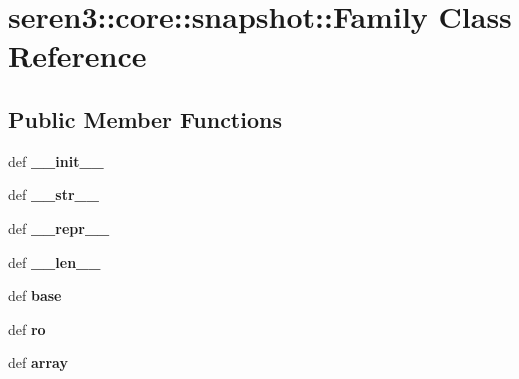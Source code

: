 \hypertarget{classseren3_1_1core_1_1snapshot_1_1Family}{
\section{seren3::core::snapshot::Family Class Reference}
\label{classseren3_1_1core_1_1snapshot_1_1Family}
}
\subsection*{Public Member Functions}
\begin{DoxyCompactItemize}
\item 
\hypertarget{classseren3_1_1core_1_1snapshot_1_1Family_a656408ec585258727145c6b82f6182e7}{
def {\bfseries \_\-\_\-init\_\-\_\-}}
\label{classseren3_1_1core_1_1snapshot_1_1Family_a656408ec585258727145c6b82f6182e7}

\item 
\hypertarget{classseren3_1_1core_1_1snapshot_1_1Family_af875f0e4ebcea9f4c97fe4665cbb3b06}{
def {\bfseries \_\-\_\-str\_\-\_\-}}
\label{classseren3_1_1core_1_1snapshot_1_1Family_af875f0e4ebcea9f4c97fe4665cbb3b06}

\item 
\hypertarget{classseren3_1_1core_1_1snapshot_1_1Family_a1a8e3fdc847c37feaf2f43e6a5d6e9bb}{
def {\bfseries \_\-\_\-repr\_\-\_\-}}
\label{classseren3_1_1core_1_1snapshot_1_1Family_a1a8e3fdc847c37feaf2f43e6a5d6e9bb}

\item 
\hypertarget{classseren3_1_1core_1_1snapshot_1_1Family_a9a7066b89a0a5e6929c2945e3a9b371b}{
def {\bfseries \_\-\_\-len\_\-\_\-}}
\label{classseren3_1_1core_1_1snapshot_1_1Family_a9a7066b89a0a5e6929c2945e3a9b371b}

\item 
\hypertarget{classseren3_1_1core_1_1snapshot_1_1Family_a94cd0455c5fa3f7047d63f69738845a2}{
def {\bfseries base}}
\label{classseren3_1_1core_1_1snapshot_1_1Family_a94cd0455c5fa3f7047d63f69738845a2}

\item 
\hypertarget{classseren3_1_1core_1_1snapshot_1_1Family_aca94533819133b8179f1145706644f98}{
def {\bfseries ro}}
\label{classseren3_1_1core_1_1snapshot_1_1Family_aca94533819133b8179f1145706644f98}

\item 
\hypertarget{classseren3_1_1core_1_1snapshot_1_1Family_ac8ec74c7f2ba6b0f5bc0e6d3a99951b8}{
def {\bfseries array}}
\label{classseren3_1_1core_1_1snapshot_1_1Family_ac8ec74c7f2ba6b0f5bc0e6d3a99951b8}


\end{DoxyCompactItemize}

